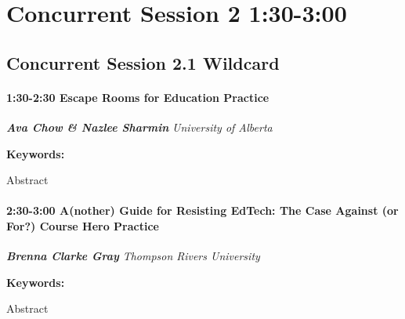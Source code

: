 \documentclass[
]{book}
\begin{document}
\hypertarget{concurrent-session-2-130-300}{%
\section*{Concurrent Session 2 \textbar{} 1:30-3:00}\label{concurrent-session-2-130-300}}

\hypertarget{concurrent-session-2.1-wildcard}{%
\subsection*{Concurrent Session 2.1 \textbar{} Wildcard}\label{concurrent-session-2.1-wildcard}}

\begin{session}
\hypertarget{escape-rooms-for-education-practice}{%
\paragraph*{\texorpdfstring{1:30-2:30 \textbar{} \textbf{Escape Rooms
for Education} \textbar{}
Practice}{1:30-2:30 \textbar{} Escape Rooms for Education \textbar{} Practice}}\label{escape-rooms-for-education-practice}}

\textbf{\emph{Ava Chow \& Nazlee Sharmin}} \textbar{} \emph{University
of Alberta}

\textbf{Keywords:}

Abstract
\end{session}

\begin{session}
\hypertarget{another-guide-for-resisting-edtech-the-case-against-or-for-course-hero-practice}{%
\paragraph*{\texorpdfstring{2:30-3:00 \textbar{} \textbf{A(nother) Guide
for Resisting EdTech: The Case Against (or For?) Course Hero} \textbar{}
Practice}{2:30-3:00 \textbar{} A(nother) Guide for Resisting EdTech: The Case Against (or For?) Course Hero \textbar{} Practice}}\label{another-guide-for-resisting-edtech-the-case-against-or-for-course-hero-practice}}

\textbf{\emph{Brenna Clarke Gray}} \textbar{} \emph{Thompson Rivers
University}

\textbf{Keywords:}

Abstract
\end{session}
\end{document}
